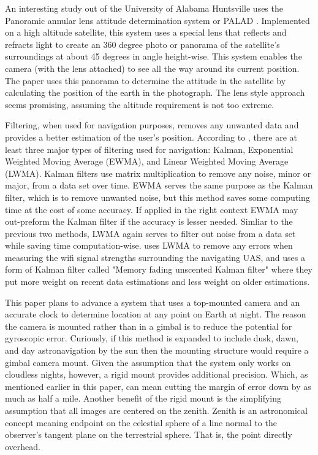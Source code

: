 \documentclass[]{article}
\begin{document}
    An interesting study out of the University of Alabama Huntsville uses the Panoramic annular lens attitude determination system or PALAD \cite{tag9}. Implemented on a high altitude satellite, this system uses a special lens that reflects and refracts light to create an 360 degree photo or panorama of the satellite's surroundings at about 45 degrees in angle height-wise. This system enables the camera (with the lens attached) to see all the way around its current position. The paper uses this panorama to determine the attitude in the satellite by calculating the position of the earth in the photograph. The lens style approach seems promising, assuming the altitude requirement is not too extreme.\newline
    
    Filtering, when used for navigation purposes, removes any unwanted data and provides a better estimation of the user's position. According to \cite{tag7}, there are at least three major types of filtering used for navigation: Kalman, Exponential Weighted Moving Average (EWMA), and Linear Weighted Moving Average (LWMA). Kalman filters use matrix multiplication to remove any noise, minor or major, from a data set over time. EWMA serves the same purpose as the Kalman filter, which is to remove unwanted noise, but this method saves some computing time at the cost of some accuracy. If applied in the right context EWMA may out-preform the Kalman filter if the accuracy is lesser needed. Simliar to the previous two methods, LWMA again serves to filter out noise from a data set while saving time computation-wise. \cite{tag7} uses LWMA to remove any errors when measuring the wifi signal strengths surrounding the navigating UAS, and \cite{tag12} uses a form of Kalman filter called "Memory fading unscented Kalman filter" where they put more weight on recent data estimations and less weight on older estimations.\newline
    
    This paper plans to advance a system that uses a top-mounted camera and an accurate clock to determine location at any point on Earth at night. The reason the camera is mounted rather than in a gimbal is to reduce the potential for gyroscopic error. Curiously, if this method is expanded to include dusk, dawn, and day astronavigation by the sun then the mounting structure would require a gimbal camera mount. Given the assumption that the system only works on cloudless nights, however, a rigid mount provides additional precision. Which, as mentioned earlier in this paper, can mean cutting the margin of error down by as much as half a mile. Another benefit of the rigid mount is the simplifying assumption that all images are centered on the zenith. Zenith is an astronomical concept meaning endpoint on the celestial sphere of a line normal to the observer's tangent plane on the terrestrial sphere. That is, the point directly overhead.\newline
    
\end{document}
